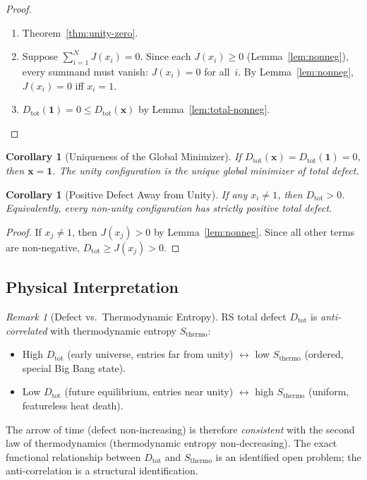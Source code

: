 \documentclass[12pt,a4paper]{article}
\newtheorem{corollary}[theorem]{Corollary}
\theoremstyle{definition}
\theoremstyle{remark}
\newtheorem{remark}[theorem]{Remark}
\begin{document}
\begin{proof}\mbox{}
\begin{enumerate}[label=(\roman*)]
  \item Theorem~\ref{thm:unity-zero}.

  \item Suppose $\sum_{i=1}^N J(x_i) = 0$.  Since each $J(x_i) \geq 0$
    (Lemma~\ref{lem:nonneg}), every summand must vanish: $J(x_i) = 0$ for
    all~$i$.  By Lemma~\ref{lem:nonneg}, $J(x_i) = 0$ iff $x_i = 1$.

  \item $D_{\mathrm{tot}}(\mathbf{1}) = 0 \leq D_{\mathrm{tot}}(\mathbf{x})$
    by Lemma~\ref{lem:total-nonneg}. \qedhere
\end{enumerate}
\end{proof}

\begin{corollary}[Uniqueness of the Global Minimizer]
\label{cor:unique-min}
If $D_{\mathrm{tot}}(\mathbf{x}) = D_{\mathrm{tot}}(\mathbf{1}) = 0$,
then $\mathbf{x} = \mathbf{1}$.  The unity configuration is the unique
global minimizer of total defect.
\end{corollary}

\begin{corollary}[Positive Defect Away from Unity]
\label{cor:pos-entropy}
If any $x_i \neq 1$, then $D_{\mathrm{tot}} > 0$.  Equivalently, every
non-unity configuration has strictly positive total defect.
\end{corollary}

\begin{proof}
If $x_j \neq 1$, then $J(x_j) > 0$ by Lemma~\ref{lem:nonneg}.  Since
all other terms are non-negative,
$D_{\mathrm{tot}} \geq J(x_j) > 0$.
\end{proof}

\subsection{Physical Interpretation}

\begin{remark}[Defect vs.\ Thermodynamic Entropy]
\label{rem:anti-correlation}
RS total defect $D_{\mathrm{tot}}$ is \emph{anti-correlated} with
thermodynamic entropy $S_{\mathrm{thermo}}$:
\begin{itemize}[nosep]
  \item High $D_{\mathrm{tot}}$ (early universe, entries far from unity)
  $\longleftrightarrow$ low $S_{\mathrm{thermo}}$ (ordered, special Big Bang state).
  \item Low $D_{\mathrm{tot}}$ (future equilibrium, entries near unity)
  $\longleftrightarrow$ high $S_{\mathrm{thermo}}$ (uniform, featureless heat death).
\end{itemize}
The arrow of time (defect non-increasing) is therefore \emph{consistent}
with the second law of thermodynamics (thermodynamic entropy non-decreasing).
The exact functional relationship between $D_{\mathrm{tot}}$ and
$S_{\mathrm{thermo}}$ is an identified open problem; the anti-correlation
is a structural identification.
\end{remark}
\end{document}
